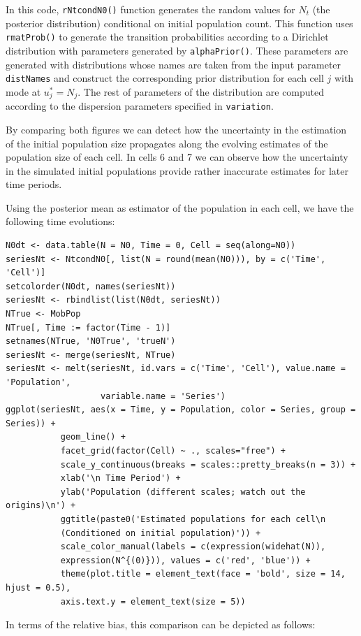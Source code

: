 \documentclass[12pt, a4paper]{article}
\begin{document}
In this code, \texttt{rNtcondN0()} function generates the random values for $N_{t}$ (the posterior 
distribution) conditional on initial population count. This function uses \texttt{rmatProb()}  to generate 
the transition probabilities according to a Dirichlet distribution with parameters generated by \texttt{alphaPrior()}. 
These parameters are generated with distributions whose names are taken from the input 
parameter \texttt{distNames} and construct the corresponding prior distribution for each cell $j$ with 
mode at $u_{j}^{*}=N_{j}$. The rest of parameters of the distribution are computed according to the 
dispersion parameters specified in \texttt{variation}.

By comparing both figures we can detect how the uncertainty in the estimation of the initial population 
size propagates along the evolving estimates of the population size of each cell. In cells 6 and 7 we can 
observe how the uncertainty in the simulated initial populations provide rather inaccurate estimates for later time periods. 

Using the posterior mean as estimator of the population in each cell, we have the following time evolutions:

\begin{verbatim}
N0dt <- data.table(N = N0, Time = 0, Cell = seq(along=N0))
seriesNt <- NtcondN0[, list(N = round(mean(N0))), by = c('Time', 'Cell')]
setcolorder(N0dt, names(seriesNt))
seriesNt <- rbindlist(list(N0dt, seriesNt))
NTrue <- MobPop
NTrue[, Time := factor(Time - 1)]
setnames(NTrue, 'N0True', 'trueN')
seriesNt <- merge(seriesNt, NTrue)
seriesNt <- melt(seriesNt, id.vars = c('Time', 'Cell'), value.name = 'Population', 
                   variable.name = 'Series')
ggplot(seriesNt, aes(x = Time, y = Population, color = Series, group = Series)) + 
           geom_line() + 
           facet_grid(factor(Cell) ~ ., scales="free") +
           scale_y_continuous(breaks = scales::pretty_breaks(n = 3)) +
           xlab('\n Time Period') + 
           ylab('Population (different scales; watch out the origins)\n') +
           ggtitle(paste0('Estimated populations for each cell\n 
           (Conditioned on initial population)')) +
           scale_color_manual(labels = c(expression(widehat(N)), 
           expression(N^{(0)})), values = c('red', 'blue')) +
           theme(plot.title = element_text(face = 'bold', size = 14, hjust = 0.5), 
           axis.text.y = element_text(size = 5))
\end{verbatim}
 
In terms of the relative bias, this comparison can be depicted as follows:
 
\end{document}
